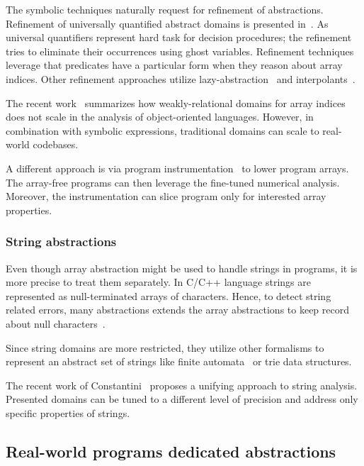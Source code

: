 The symbolic techniques naturally request for refinement of abstractions.
Refinement of universally quantified abstract domains is presented in~\cite{Seghir2009}.
As universal quantifiers represent hard task for decision procedures; the
refinement tries to eliminate their occurrences using ghost variables.
Refinement techniques leverage that predicates have a particular form when they
reason about array indices. Other refinement approaches utilize lazy-abstraction~\cite{Alberti2012} and interpolants~\cite{Alberti2012b}.

The recent work~\cite{Payet2018} summarizes how weakly-relational domains for
array indices does not scale in the analysis of object-oriented languages.
However, in combination with symbolic expressions, traditional domains can
scale to real-world codebases.

A different approach is via program instrumentation~\cite{Cornish2015} to lower
program arrays. The array-free programs can then leverage the fine-tuned
numerical analysis. Moreover, the instrumentation can slice program only for
interested array properties.


\subsubsection{String abstractions}

Even though array abstraction might be used to handle strings in programs, it
is more precise to treat them separately. In C/C++ language strings are
represented as null-terminated arrays of characters. Hence, to detect string
related errors, many abstractions extends the array abstractions to keep record
about null characters~\cite{Olliaro2018}.

Since string domains are more restricted, they utilize other formalisms to
represent an abstract set of strings like finite
automata~\cite{Christensen2003} or trie data structures.

The recent work of Constantini~\cite{Costantini2011, Costantini2015} proposes a
unifying approach to string analysis.  Presented domains can be tuned to a
different level of precision and address only specific properties of strings.


\subsection{Real-world programs dedicated abstractions}

